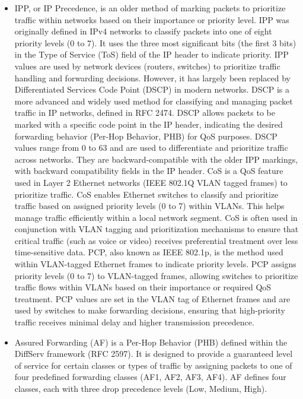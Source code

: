 \documentclass{article}
\begin{document}
\begin{itemize}
	\item[] IPP, or IP Precedence, is an older method of marking packets to prioritize traffic within networks based on their importance or priority level. IPP was originally defined in IPv4 networks to classify packets into one of eight priority levels (0 to 7). It uses the three most significant bits (the first 3 bits) in the Type of Service (ToS) field of the IP header to indicate priority. IPP values are used by network devices (routers, switches) to prioritize traffic handling and forwarding decisions. However, it has largely been replaced by Differentiated Services Code Point (DSCP) in modern networks. DSCP is a more advanced and widely used method for classifying and managing packet traffic in IP networks, defined in RFC 2474. DSCP allows packets to be marked with a specific code point in the IP header, indicating the desired forwarding behavior (Per-Hop Behavior, PHB) for QoS purposes. DSCP values range from 0 to 63 and are used to differentiate and prioritize traffic across networks. They are backward-compatible with the older IPP markings, with backward compatibility fields in the IP header. CoS is a QoS feature used in Layer 2 Ethernet networks (IEEE 802.1Q VLAN tagged frames) to prioritize traffic. CoS enables Ethernet switches to classify and prioritize traffic based on assigned priority levels (0 to 7) within VLANs. This helps manage traffic efficiently within a local network segment. CoS is often used in conjunction with VLAN tagging and prioritization mechanisms to ensure that critical traffic (such as voice or video) receives preferential treatment over less time-sensitive data.  PCP, also known as IEEE 802.1p, is the method used within VLAN-tagged Ethernet frames to indicate priority levels. PCP assigns priority levels (0 to 7) to VLAN-tagged frames, allowing switches to prioritize traffic flows within VLANs based on their importance or required QoS treatment. PCP values are set in the VLAN tag of Ethernet frames and are used by switches to make forwarding decisions, ensuring that high-priority traffic receives minimal delay and higher transmission precedence.
	\item[] Assured Forwarding (AF) is a Per-Hop Behavior (PHB) defined within the DiffServ framework (RFC 2597). It is designed to provide a guaranteed level of service for certain classes or types of traffic by assigning packets to one of four predefined forwarding classes (AF1, AF2, AF3, AF4). AF defines four classes, each with three drop precedence levels (Low, Medium, High).\\

\end{itemize}
\end{document}
